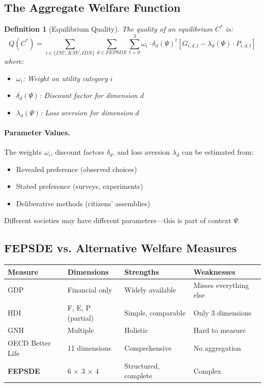 \documentclass[12pt,a4paper]{article}
\newtheorem{definition}[theorem]{Definition}
\begin{document}
\subsection{The Aggregate Welfare Function}

\begin{definition}[Equilibrium Quality]
The quality of an equilibrium $C^*$ is:
\begin{equation}
  Q(C^*) = \sum_{i \in \{INU, KNU, IDN\}} \sum_{d \in FEPSDE} \sum_{t=0}^{3} 
           \omega_i \cdot \delta_d(\Psi)^t \left[ G_{i,d,t} - \lambda_d(\Psi) \cdot P_{i,d,t} \right]
  \label{eq:eqquality}
\end{equation}
where:
\begin{itemize}
  \item $\omega_i$: Weight on utility category $i$
  \item $\delta_d(\Psi)$: Discount factor for dimension $d$
  \item $\lambda_d(\Psi)$: Loss aversion for dimension $d$
\end{itemize}
\end{definition}

\paragraph{Parameter Values.}
The weights $\omega_i$, discount factors $\delta_d$, and loss aversion $\lambda_d$
can be estimated from:
\begin{itemize}
  \item Revealed preference (observed choices)
  \item Stated preference (surveys, experiments)
  \item Deliberative methods (citizens' assemblies)
\end{itemize}

Different societies may have different parameters---this is part of context $\Psi$.

\subsection{FEPSDE vs. Alternative Welfare Measures}

\begin{center}
\renewcommand{\arraystretch}{1.3}
\begin{tabular}{llll}
\hline
\textbf{Measure} & \textbf{Dimensions} & \textbf{Strengths} & \textbf{Weaknesses} \\
\hline
GDP & Financial only & Widely available & Misses everything else \\
HDI & F, E, P (partial) & Simple, comparable & Only 3 dimensions \\
GNH & Multiple & Holistic & Hard to measure \\
OECD Better Life & 11 dimensions & Comprehensive & No aggregation \\
\textbf{FEPSDE} & 6 $\times$ 3 $\times$ 4 & Structured, complete & Complex \\
\hline
\end{tabular}
\end{center}
\end{document}
